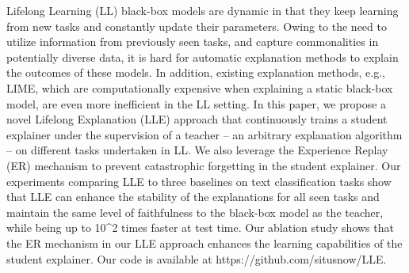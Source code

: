 Lifelong Learning (LL) black-box models are dynamic in that they keep learning from new tasks and constantly update their parameters. Owing to the need to utilize information from previously seen tasks, and capture commonalities in potentially diverse data, it is hard for automatic explanation methods to explain the outcomes of these models. In addition, existing explanation methods, e.g., LIME, which are computationally expensive when explaining a static black-box model, are even more inefficient in the LL setting. In this paper, we propose a novel Lifelong Explanation (LLE) approach that continuously trains a student explainer under the supervision of a teacher -- an arbitrary explanation algorithm -- on different tasks undertaken in LL. We also leverage the Experience Replay (ER) mechanism to prevent catastrophic forgetting in the student explainer. Our experiments comparing LLE to three baselines on text classification tasks show that LLE can enhance the stability of the explanations for all seen tasks and maintain the same level of faithfulness to the black-box model as the teacher, while being up to 10^2 times faster at test time. Our ablation study shows that the ER mechanism in our LLE approach enhances the learning capabilities of the student explainer. Our code is available at https://github.com/situsnow/LLE.

